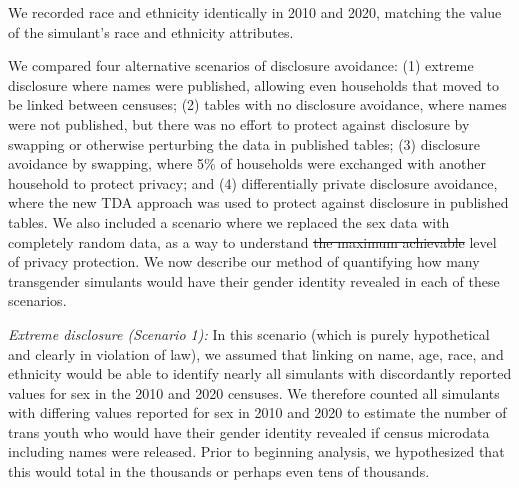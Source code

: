 \documentclass{jpc} %
\theoremstyle{plain}\newtheorem{satz}[thm]{Satz} %
\providecommand{\DIFaddtex}[1]{{\protect\color{blue}\uwave{#1}}} %
\providecommand{\DIFdeltex}[1]{{\protect\color{red}\sout{#1}}}                      %
\providecommand{\DIFaddbegin}{} %
\providecommand{\DIFaddend}{} %
\providecommand{\DIFdelbegin}{} %
\providecommand{\DIFdelend}{} %
\providecommand{\DIFadd}[1]{\texorpdfstring{\DIFaddtex{#1}}{#1}} %
\providecommand{\DIFdel}[1]{\texorpdfstring{\DIFdeltex{#1}}{}} %
\begin{document}
We recorded race and ethnicity identically in 2010 and 2020, matching the value of the simulant's race and ethnicity attributes.

We compared four alternative scenarios of disclosure avoidance: (1) extreme disclosure where names were published, allowing even households that moved to be linked between censuses; (2) tables with no disclosure avoidance, where names were not published, but there was no effort to protect against disclosure by swapping or otherwise perturbing the data in published tables; (3) disclosure avoidance by swapping, where 5\% of households were exchanged with another household to protect privacy; and (4) differentially private disclosure avoidance, where the new TDA approach was used to protect against disclosure in published tables.  We also included a scenario where we replaced the sex data with completely random data, as a way to understand \DIFdelbegin \DIFdel{the maximum achievable }\DIFdelend \DIFaddbegin \DIFadd{a baseline maximum }\DIFaddend level of privacy protection.  We now describe our method of quantifying how many transgender simulants would have their gender identity revealed in each of these scenarios.

\emph{Extreme disclosure (Scenario 1):} In this scenario (which is purely hypothetical and clearly in violation of law), we assumed that linking on name, age, race, and ethnicity would be able to identify nearly all simulants with discordantly reported values for sex in the 2010 and 2020 censuses.  We therefore counted all simulants with differing values reported for sex in 2010 and 2020 to estimate the number of trans youth who would have their gender identity revealed if census microdata including names were released.  Prior to beginning analysis, we hypothesized that this would total in the thousands or perhaps even tens of thousands.
\end{document}
